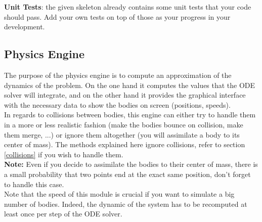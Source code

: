 \documentclass{article}
\begin{document}
\textbf{Unit Tests}: the given skeleton already contains some unit tests that your code should pass. Add your own tests on top of those as your progress in your development.

\subsection{Physics Engine}
\label{moteurphysique}

The purpose of the physics engine is to compute an approximation of the dynamics of the problem. On the one hand it computes the values that the ODE solver will integrate, and on the other hand it provides the graphical interface with the necessary data to show the bodies on screen (positions, speeds).\\
In regards to collisions between bodies, this engine can either try to handle them in a more or less realistic fashion (make the bodies bounce on collision, make them merge, ...) or ignore them altogether (you will assimilate a body to its center of mass). The methods explained here ignore collisions, refer to section \ref{collisions} if you wish to handle them. \\
\textbf{Note:} Even if you decide to assimilate the bodies to their center of mass, there is a small probability that two points end at the exact same position, don't forget to handle this case.\\

Note that the speed of this module is crucial if you want to simulate a big number of bodies. Indeed, the dynamic of the system has to be recomputed at least once per step of the ODE solver.
\end{document}
